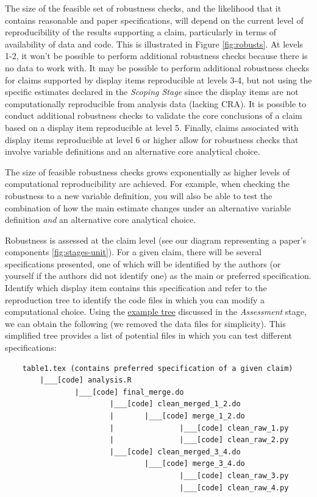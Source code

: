 \documentclass[]{book}
\begin{document}
The size of the feasible set of robustness checks, and the likelihood that it contains reasonable and paper specifications, will depend on the current level of reproducibility of the results supporting a claim, particularly in terms of availability of data and code. This is illustrated in Figure \ref{fig:robusts}. At levels 1-2, it won't be possible to perform additional robustness checks because there is no data to work with. It may be possible to perform additional robustness checks for claims supported by display items reproducible at levels 3-4, but not using the specific estimates declared in the \emph{Scoping Stage} since the display items are not computationally reproducible from analysis data (lacking CRA). It is possible to conduct additional robustness checks to validate the core conclusions of a claim based on a display item reproducible at level 5. Finally, claims associated with display items reproducible at level 6 or higher allow for robustness checks that involve variable definitions and an alternative core analytical choice.

The size of feasible robustness checks grows exponentially as higher levels of computational reproducibility are achieved. For example, when checking the robustness to a new variable definition, you will also be able to test the combination of how the main estimate changes under an alternative variable definition \emph{and} an alternative core analytical choice.

Robustness is assessed at the claim level (see our diagram representing a paper's components \ref{fig:stages-unit}). For a given claim, there will be several specifications presented, one of which will be identified by the authors (or yourself if the authors did not identify one) as the main or preferred specification. Identify which display item contains this specification and refer to the reproduction tree to identify the code files in which you can modify a computational choice. Using the \protect\hyperlink{complete-tree}{example tree} discussed in the \emph{Assessment} stage, we can obtain the following (we removed the data files for simplicity). This simplified tree provides a list of potential files in which you can test different specifications:

\begin{verbatim}
    table1.tex (contains preferred specification of a given claim)
        |___[code] analysis.R
                |___[code] final_merge.do
                        |___[code] clean_merged_1_2.do
                        |       |___[code] merge_1_2.do
                        |               |___[code] clean_raw_1.py
                        |               |___[code] clean_raw_2.py
                        |___[code] clean_merged_3_4.do
                                |___[code] merge_3_4.do
                                        |___[code] clean_raw_3.py
                                        |___[code] clean_raw_4.py
                                        
\end{verbatim}
\end{document}

